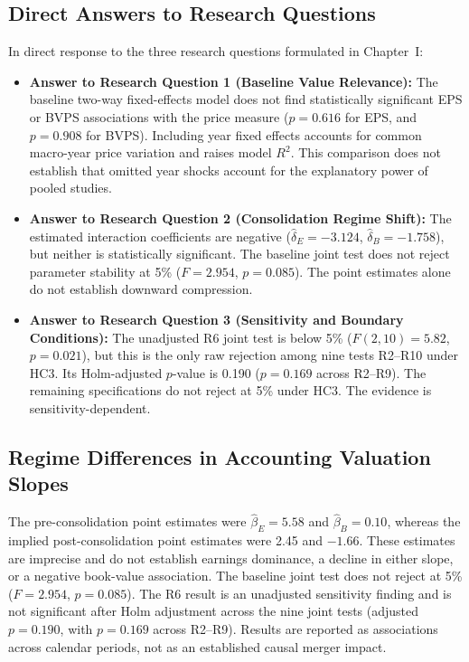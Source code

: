 \subsection{Direct Answers to Research Questions}
In direct response to the three research questions formulated in Chapter~I:
\begin{itemize}
    \item \textbf{Answer to Research Question 1 (Baseline Value Relevance):} The baseline two-way fixed-effects model does not find statistically significant EPS or BVPS associations with the price measure ($p = 0.616$ for EPS, and $p = 0.908$ for BVPS). Including year fixed effects accounts for common macro-year price variation and raises model $R^2$. This comparison does not establish that omitted year shocks account for the explanatory power of pooled studies.
    \item \textbf{Answer to Research Question 2 (Consolidation Regime Shift):} The estimated interaction coefficients are negative ($\hat{\delta}_E=-3.124$, $\hat{\delta}_B=-1.758$), but neither is statistically significant. The baseline joint test does not reject parameter stability at 5\% ($F=2.954$, $p=0.085$). The point estimates alone do not establish downward compression.
    \item \textbf{Answer to Research Question 3 (Sensitivity and Boundary Conditions):} The unadjusted R6 joint test is below 5\% ($F(2,10)=5.82$, $p=0.021$), but this is the only raw rejection among nine tests R2--R10 under HC3. Its Holm-adjusted $p$-value is 0.190 ($p = 0.169$ across R2--R9). The remaining specifications do not reject at 5\% under HC3. The evidence is sensitivity-dependent.
\end{itemize}

\subsection{Regime Differences in Accounting Valuation Slopes}
The pre-consolidation point estimates were $\hat{\beta}_E=5.58$ and $\hat{\beta}_B=0.10$, whereas the implied post-consolidation point estimates were 2.45 and $-1.66$. These estimates are imprecise and do not establish earnings dominance, a decline in either slope, or a negative book-value association. The baseline joint test does not reject at 5\% ($F=2.954$, $p=0.085$). The R6 result is an unadjusted sensitivity finding and is not significant after Holm adjustment across the nine joint tests (adjusted $p=0.190$, with $p = 0.169$ across R2--R9). Results are reported as associations across calendar periods, not as an established causal merger impact.

